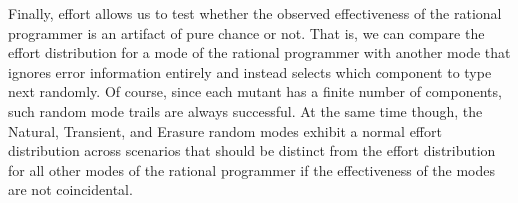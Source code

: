Finally, effort allows us to test whether the observed effectiveness 
of the rational programmer is an artifact of pure chance or not.
That is, we can compare the effort distribution for a mode of the
rational programmer with another mode that ignores error information entirely
and instead selects which component to type next randomly. 
Of course, since each mutant has a finite number of components, 
such random mode trails are always successful. At the same time though,
the Natural, Transient, and Erasure random modes exhibit a normal effort
distribution across scenarios that should be distinct from the effort distribution for all other modes of
the rational programmer if the effectiveness of the modes are not
coincidental.




